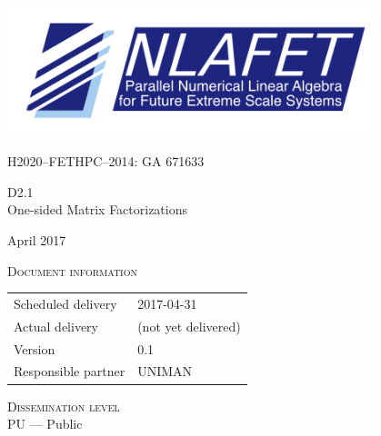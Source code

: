 \documentclass[a4paper,12pt]{article}
\def\nlafetMajor{2}
\def\nlafetMinor{1}
\def\nlafetTitle{One-sided Matrix Factorizations}
\def\nlafetMonth{April}
\def\nlafetYear{2017}
\def\nlafetScheduledDelivery{2017-04-31}
\def\nlafetActualDelivery{(not yet delivered)}
\def\nlafetVersionMajor{0}
\def\nlafetVersionMinor{1}
\def\nlafetResponsiblePartner{UNIMAN}
\def\nlafetDisseminationLevel{PU --- Public}
\begin{document}
\begin{titlepage}
  \centering
  {
    \includegraphics[width=0.8\textwidth]{NLAFET-logo2}
  }
  \par
  \vspace{5mm}
  {
    H2020--FETHPC--2014: GA 671633
  }
  \par
  \vspace{4cm}
  {
    \Huge
    D\nlafetMajor.\nlafetMinor\\[1em]
    \nlafetTitle
  }
  \par
  \vfill
  {
    \Large
    \nlafetMonth{}
    \nlafetYear
  }
\end{titlepage}



%

\newpage




\noindent
\textsc{Document information}\\[1em]
\begin{tabular}{@{}ll}
  Scheduled delivery & \nlafetScheduledDelivery \\
  Actual delivery & \nlafetActualDelivery \\
  Version & \nlafetVersionMajor.\nlafetVersionMinor \\
  Responsible partner & \nlafetResponsiblePartner \\
\end{tabular}

\vspace{2em}




\noindent
\textsc{Dissemination level}\\[1em]
\nlafetDisseminationLevel
\end{document}
